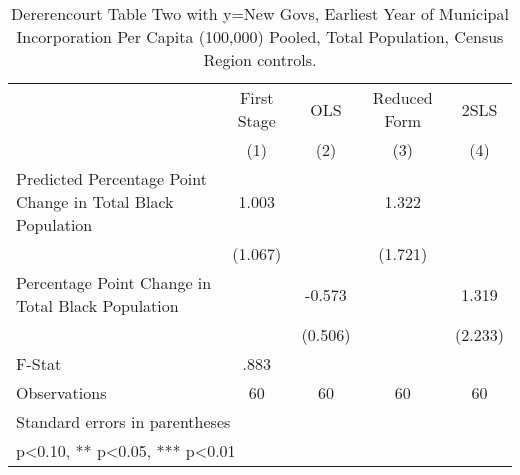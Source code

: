 \begin{table}[htbp]\centering
\def\sym#1{\ifmmode^{#1}\else\(^{#1}\)\fi}
\caption{Dererencourt Table Two with y=New Govs, Earliest Year of Municipal Incorporation Per Capita (100,000) Pooled, Total Population, Census Region controls.}
\begin{tabular}{l*{4}{c}}
\toprule
                    & First Stage   &         OLS   &Reduced Form   &        2SLS   \\
                    &\multicolumn{1}{c}{(1)}   &\multicolumn{1}{c}{(2)}   &\multicolumn{1}{c}{(3)}   &\multicolumn{1}{c}{(4)}   \\
\midrule
Predicted Percentage Point Change in Total Black Population&       1.003   &               &       1.322   &               \\
                    &     (1.067)   &               &     (1.721)   &               \\
\addlinespace
Percentage Point Change in Total Black Population&               &      -0.573   &               &       1.319   \\
                    &               &     (0.506)   &               &     (2.233)   \\
\midrule
F-Stat              &        .883   &               &               &               \\
Observations        &          60   &          60   &          60   &          60   \\
\bottomrule
\multicolumn{5}{l}{\footnotesize Standard errors in parentheses}\\
\multicolumn{5}{l}{\footnotesize * p<0.10, ** p<0.05, *** p<0.01}\\
\end{tabular}
\end{table}
